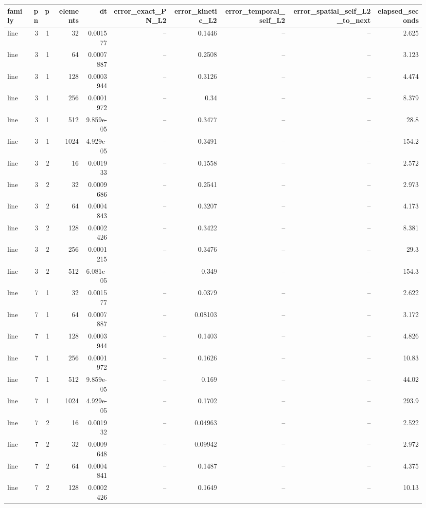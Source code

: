 \begin{tabular}{lrrrrrrrrr}
\hline
family & pn & p & elements & dt & error\_exact\_PN\_L2 & error\_kinetic\_L2 & error\_temporal\_self\_L2 & error\_spatial\_self\_L2\_to\_next & elapsed\_seconds \\
\hline
line & 3 & 1 & 32 & 0.001577 & -- & 0.1446 & -- & -- & 2.625 \\
line & 3 & 1 & 64 & 0.0007887 & -- & 0.2508 & -- & -- & 3.123 \\
line & 3 & 1 & 128 & 0.0003944 & -- & 0.3126 & -- & -- & 4.474 \\
line & 3 & 1 & 256 & 0.0001972 & -- & 0.34 & -- & -- & 8.379 \\
line & 3 & 1 & 512 & 9.859e-05 & -- & 0.3477 & -- & -- & 28.8 \\
line & 3 & 1 & 1024 & 4.929e-05 & -- & 0.3491 & -- & -- & 154.2 \\
line & 3 & 2 & 16 & 0.001933 & -- & 0.1558 & -- & -- & 2.572 \\
line & 3 & 2 & 32 & 0.0009686 & -- & 0.2541 & -- & -- & 2.973 \\
line & 3 & 2 & 64 & 0.0004843 & -- & 0.3207 & -- & -- & 4.173 \\
line & 3 & 2 & 128 & 0.0002426 & -- & 0.3422 & -- & -- & 8.381 \\
line & 3 & 2 & 256 & 0.0001215 & -- & 0.3476 & -- & -- & 29.3 \\
line & 3 & 2 & 512 & 6.081e-05 & -- & 0.349 & -- & -- & 154.3 \\
line & 7 & 1 & 32 & 0.001577 & -- & 0.0379 & -- & -- & 2.622 \\
line & 7 & 1 & 64 & 0.0007887 & -- & 0.08103 & -- & -- & 3.172 \\
line & 7 & 1 & 128 & 0.0003944 & -- & 0.1403 & -- & -- & 4.826 \\
line & 7 & 1 & 256 & 0.0001972 & -- & 0.1626 & -- & -- & 10.83 \\
line & 7 & 1 & 512 & 9.859e-05 & -- & 0.169 & -- & -- & 44.02 \\
line & 7 & 1 & 1024 & 4.929e-05 & -- & 0.1702 & -- & -- & 293.9 \\
line & 7 & 2 & 16 & 0.001932 & -- & 0.04963 & -- & -- & 2.522 \\
line & 7 & 2 & 32 & 0.0009648 & -- & 0.09942 & -- & -- & 2.972 \\
line & 7 & 2 & 64 & 0.0004841 & -- & 0.1487 & -- & -- & 4.375 \\
line & 7 & 2 & 128 & 0.0002426 & -- & 0.1649 & -- & -- & 10.13 \\

\end{tabular}

